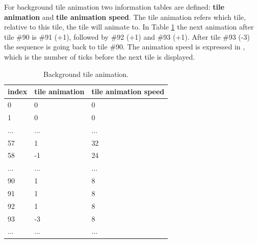 \documentclass[book.tex]{subfiles}
\begin{document}
For background tile animation two information tables are defined: \textbf{tile animation} and \textbf{tile animation speed}. The tile animation refers which tile, relative to this tile, the tile will animate to. In Table \ref{table:background tile anim} the next animation after tile \#90 is \#91 (+1), followed by \#92 (+1) and \#93 (+1). After tile \#93 (-3) the sequence is going back to tile \#90. The animation speed is expressed in , which is the number of ticks before the next tile is displayed. \\
 \begin{table}[H]
  \begin{tabularx}{\textwidth}[c]{XXX}
  \hline
  \textbf{index} & \textbf{tile animation} & \textbf{tile animation speed}   \\ \hline
  0             & 0          & 0    \\
  1             & 0          & 0    \\
  ...             & ...          & ...    \\
  57             & 1          & 32    \\
  58             & -1          & 24    \\
  ...             & ...          & ...    \\
  90             & 1          & 8    \\
  91            & 1          & 8    \\
  92             & 1          & 8    \\
  93             & -3          & 8    \\
  ...             & ...          & ...    \\
  \end{tabularx}
  \caption{Background tile animation.}
  \label{table:background tile anim}
  \end{table}
  
\end{document}
